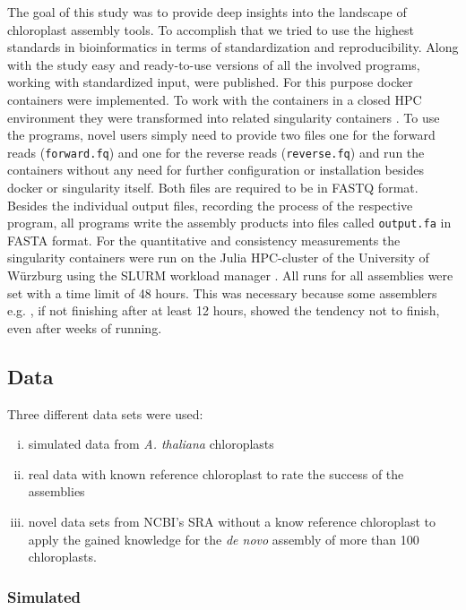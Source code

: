 The goal of this study was to provide deep insights into the landscape of chloroplast assembly tools. To
accomplish that we tried to use the highest standards in bioinformatics in terms of standardization and
reproducibility. Along with the study easy and ready-to-use versions of all the involved programs, working
with standardized input, were published. For this purpose docker containers \cite{merkel2014docker} were
implemented. To work with the containers in a closed HPC environment they were transformed into related
singularity containers \cite{kurtzer2017singularity}. To use the programs, novel users simply need to provide
two files one for the forward reads (\texttt{forward.fq}) and one for the reverse reads (\texttt{reverse.fq})
and run the containers without any need for further configuration or installation besides docker or
singularity itself. Both files are required to be in FASTQ format. Besides the individual output files,
recording the process of the respective program, all programs write the assembly products into files called
\texttt{output.fa} in FASTA format. For the quantitative and consistency measurements the singularity
containers were run on the Julia HPC-cluster of the University of W\"{u}rzburg using the SLURM workload
manager \cite{Jette02slurm}. All runs for all assemblies were set with a time limit of 48 hours. This was
necessary because some assemblers e.g. \ioga, if not finishing after at least 12 hours, showed the tendency not
to finish, even after weeks of running.

\subsection{Data}
Three different data sets were used:
\begin{enumerate}[(i)]
\item simulated data from \textit{A. thaliana} chloroplasts 
\item real data with known reference chloroplast to rate the success of the assemblies 
\item novel data sets from NCBI's SRA without a know reference chloroplast to apply the gained knowledge for the
\textit{de novo} assembly of more than 100 chloroplasts.
\end{enumerate}
\subsubsection{Simulated}

